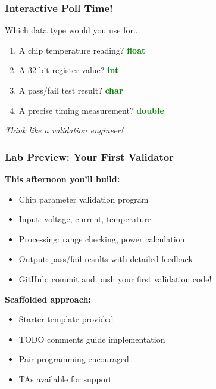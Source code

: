 \documentclass{beamer}
\begin{document}
\begin{frame}
\frametitle{Interactive Poll Time!}
\begin{center}
\Large Which data type would you use for...
\end{center}

\begin{enumerate}
    \item A chip temperature reading? \pause \textcolor{green}{\textbf{float}}
    \item A 32-bit register value? \pause \textcolor{green}{\textbf{int}}
    \item A pass/fail test result? \pause \textcolor{green}{\textbf{char}}
    \item A precise timing measurement? \pause \textcolor{green}{\textbf{double}}
\end{enumerate}

\vspace{0.5cm}
\begin{center}
\textit{Think like a validation engineer!}
\end{center}
\end{frame}

\begin{frame}
\frametitle{Lab Preview: Your First Validator}
\textbf{This afternoon you'll build:}
\begin{itemize}
    \item Chip parameter validation program
    \item Input: voltage, current, temperature
    \item Processing: range checking, power calculation
    \item Output: pass/fail results with detailed feedback
    \item GitHub: commit and push your first validation code!
\end{itemize}

\vspace{0.5cm}
\textbf{Scaffolded approach:}
\begin{itemize}
    \item Starter template provided
    \item TODO comments guide implementation
    \item Pair programming encouraged
    \item TAs available for support
\end{itemize}
\end{frame}
\end{document}
